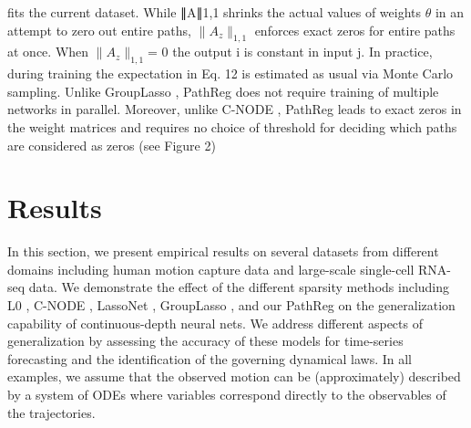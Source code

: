 \documentclass{article}
\begin{document}
   \begin{table}[ht]
\centering
\caption{Results for the synthetic second-order ODE}
\vspace{0.5em} %
\end{table}

    
    fits the current dataset. While ∥A∥1,1 shrinks the actual values of weights $\theta$ in an attempt to zero out
    entire paths, $\|A_z\|_{1,1}$ enforces exact zeros for entire paths at once. When $\|A_z\|_{1,1}$= 0 the output i is
    constant in input j. In practice, during training the expectation in Eq. 12 is estimated as usual via
    Monte Carlo sampling.
    Unlike GroupLasso \cite{Ross17}, PathReg does not require training of multiple networks in parallel. Moreover,
    unlike C-NODE \cite{mu2019mnistc}, PathReg leads to exact zeros in the weight matrices and requires no choice of
    threshold for deciding which paths are considered as zeros (see Figure 2)
\section{Results}
In this section, we present empirical results on several datasets from different domains including
human motion capture data and large-scale single-cell RNA-seq data. We demonstrate the effect of
the different sparsity methods including L0 \cite{neyshabur2018understanding}, C-NODE \cite{Zhang16}, LassoNet \cite{Ng20}, GroupLasso \cite{Micci2013}, and
our PathReg on the generalization capability of continuous-depth neural nets. We address different
aspects of generalization by assessing the accuracy of these models for time-series forecasting and
the identification of the governing dynamical laws. In all examples, we assume that the observed
motion can be (approximately) described by a system of ODEs where variables correspond directly
to the observables of the trajectories.
    \setcounter{subsection}{1}
\end{document}
